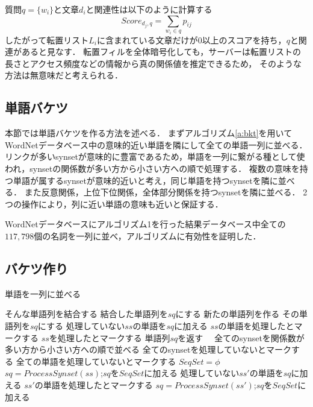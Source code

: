 \documentclass[master]{suribt}
\theoremstyle{definition}
\begin{document}
 質問$q=\{w_i\}$と文章$d_i$と関連性は以下のように計算する
 \begin{equation}
 Score_{d_j,q} = \sum_{w_i \in q}p_{ij}
 \end{equation}
 したがって転置リスト$L_i$に含まれている文章だけが$0$以上のスコアを持ち，$q$と関連があると見なす．
 転置フィルを全体暗号化しても，サーバーは転置リストの長さとアクセス頻度などの情報から真の関係値を推定できるため，
 そのような方法は無意味だと考えられる．
 
 \subsection{単語バケツ} 
 本節では単語バケツを作る方法を述べる．
 まずアルゴリズム\ref{a:bkt}を用いてWordNetデータベース中の意味的近い単語を隣にして全ての単語一列に並べる．
 リンクが多いsynsetが意味的に豊富であるため，単語を一列に繋がる種として使われ，synsetの関係数が多い方から小さい方への順で処理する．
 複数の意味を持つ単語が属するsynsetが意味的近いと考え，同じ単語を持つsynsetを隣に並べる．
 また反意関係，上位下位関係，全体部分関係を持つsynsetを隣に並べる．
 2つの操作により，列に近い単語の意味も近いと保証する．

 WordNetデータベースにアルゴリズム1を行った結果データベース中全ての$117,798$個の名詞を一列に並べ，アルゴリズムに有効性を証明した．

 \subsection{バケツ作り}
 \begin{algorithm}
 \caption{単語を一列に並べる}
 \begin{algorithmic}[1]
   \State そんな単語列を結合する
   \State 結合した単語列を$sq$にする
   \State 新たの単語列を作る
   \State その単語列を$sq$にする
  \EndIf
  \State 処理していない$ss$の単語を$sq$に加える
  \State $ss$の単語を処理したとマークする
  \State $ss$を処理したとマークする
  \State 単語列$sq$を返す　
 \EndFunction
  \State 全てのsynsetを関係数が多い方から小さい方への順で並べる
  \State 全てのsynsetを処理していないとマークする
  \State 全ての単語を処理していないとマークする
  \State $SeqSet = \phi$
   \State $sq=ProcessSynset(ss)$;$sq$を$SeqSet$に加える
    \State 処理していない$ss'$の単語を$sq$に加える
    \State $ss'$の単語を処理したとマークする
    \State $sq=ProcessSynset(ss')$;$sq$を$SeqSet$に加える　
   \EndFor
  \EndFor
 \EndFunction
 \end{algorithmic}
 \label{a:bkt}
 \end{algorithm}
\end{document}
